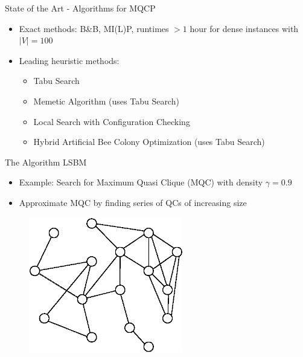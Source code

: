 \documentclass{beamer}
\begin{document}
\begin{frame}{State of the Art - Algorithms for MQCP}
    \begin{itemize}
        \item<1-> Exact methods: B\&B, MI(L)P, runtimes $> 1$ hour for dense instances with $|V|=100$
        \item<2-> Leading heuristic methods:
        \begin{itemize}
            \item<3-> Tabu Search \cite{djeddi_extension_2019}
            \item<4-> Memetic Algorithm (uses Tabu Search) \cite{zhou_opposition-based_2020}
            \item<5-> Local Search with Configuration Checking \cite{chen_nuqclq_2021}
            \item<6-> Hybrid Artificial Bee Colony Optimization (uses Tabu Search) \cite{peng_solving_2021}
        \end{itemize}
    \end{itemize}
\end{frame}

\begin{frame}{The Algorithm LSBM}
    \begin{itemize}
        \item Example: Search for Maximum Quasi Clique (MQC) with density $\gamma=0.9$ \\
        \item Approximate MQC by finding series of QCs of increasing size
    \end{itemize}
    \begin{figure}
        \centering
        \includegraphics[width=0.6\textwidth]{graphics/algorithm_poster_0.eps}
    \end{figure}
\end{frame}
\end{document}
